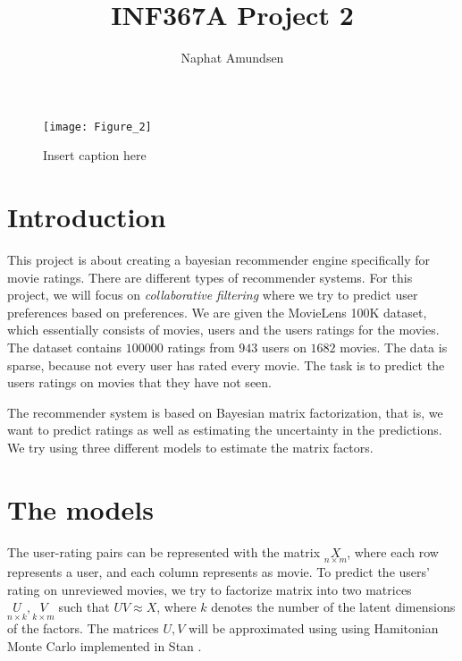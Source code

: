 \documentclass[12pt]{article}
\begin{document}
\title{\textbf{INF367A Project 2}}
\author{Naphat Amundsen}
\maketitle
\sectionfont{\fontsize{14}{15}\selectfont}
\subsectionfont{\fontsize{12}{15}\selectfont}
\subsubsectionfont{\fontsize{12}{15}\selectfont}
\graphicspath{ {./images/} }

\ifx
\begin{figure}[H]
	\centering
	\texttt{[image: Figure\_2]}
	\caption{Insert caption here}
\end{figure}
\fi

\newcommand{\opGamma}{\operatorname{Gamma}}
\newcommand{\Um}{\underset{n \times k}{U}}
\newcommand{\Vm}{\underset{k \times m}{V}}
\newcommand{\Xm}{\underset{n \times m}{X}}
\newcommand{\neff}{N_{\text{eff}}}
\newcommand{\rhat}{\hat{R}}

\section*{Introduction}
    This project is about creating a bayesian recommender engine specifically for movie ratings. There are different types of recommender systems. For this project, we will focus on \textit{collaborative filtering} where we try to predict user preferences based on preferences. We are given the MovieLens 100K dataset, which essentially consists of movies, users and the users ratings for the movies. The dataset contains $100 000$ ratings from $943$ users on $1682$ movies. The data is sparse, because not every user has rated every movie. The task is to predict the users ratings on movies that they have not seen. 

    The recommender system is based on Bayesian matrix factorization, that is, we want to predict ratings as well as estimating the uncertainty in the predictions. We try using three different models to estimate the matrix factors.

\section{The models}
    The user-rating pairs can be represented with the matrix $\Xm$, where each row represents a user, and each column represents as movie. To predict the users' rating on unreviewed movies, we try to factorize matrix into two matrices $\Um, \Vm$ such that $UV \approx X$, where $k$ denotes the number of the latent dimensions of the factors. The matrices $U,V$ will be approximated using using Hamitonian Monte Carlo implemented in Stan \cite{HMC}.
\end{document}
